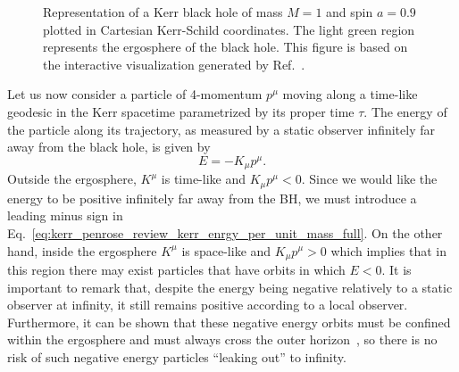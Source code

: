 \begin{figure}[!ht]
  \centering
  
  \caption{Representation of a Kerr black hole of mass $M=1$ and spin $a=0.9$ plotted in Cartesian Kerr-Schild coordinates. The light green region represents the ergosphere of the black hole. This figure is based on the interactive visualization generated by Ref.~\cite{KerrSurfaceViz}.}
  \label{fig:kerr_penrose_review_kerr_surfaces}
\end{figure}

Let us now consider a particle of 4-momentum $p^\mu$ moving along a time-like geodesic in the Kerr spacetime parametrized by its proper time $\tau$. The energy of the particle along its trajectory, as measured by a static observer infinitely far away from the black hole, is given by
%
\begin{equation}
  E = -K_\mu p^\mu.
  \label{eq:kerr_penrose_review_kerr_enrgy_per_unit_mass_full}
\end{equation}
%
Outside the ergosphere, $K^\mu$ is time-like and $K_\mu p^\mu<0$. Since we would like the energy to be positive infinitely far away from the \ac{BH}, we must introduce a leading minus sign in Eq.~\eqref{eq:kerr_penrose_review_kerr_enrgy_per_unit_mass_full}. On the other hand, inside the ergosphere $K^\mu$ is space-like and $K_\mu p^\mu >0$ which implies that in this region there may exist particles that have orbits in which $E < 0$. It is important to remark that, despite the energy being negative relatively to a static observer at infinity, it still remains positive according to a local observer. Furthermore, it can be shown that these negative energy orbits must be confined within the ergosphere and must always cross the outer horizon~\cite{Grib:2013hxa,Contopoulos1984}, so there is no risk of such negative energy particles ``leaking out'' to infinity.

